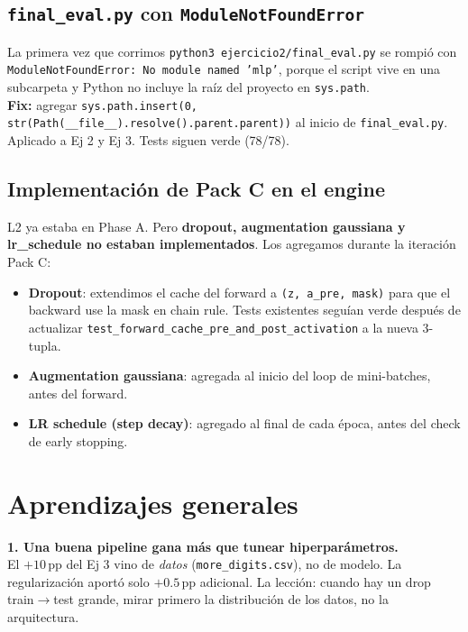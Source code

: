 \documentclass[11pt,a4paper]{article}
\newcommand{\code}[1]{\texttt{\textcolor{accent}{#1}}}
\newcommand{\file}[1]{\texttt{\small #1}}
\begin{document}
\subsection{\texttt{final\_eval.py} con \texttt{ModuleNotFoundError}}

La primera vez que corrimos \code{python3 ejercicio2/final\_eval.py} se rompió con \\
\code{ModuleNotFoundError: No module named 'mlp'}, porque el script vive en una subcarpeta y Python no incluye la raíz del proyecto en \code{sys.path}. \\[0.4em]
\textbf{Fix:} agregar \code{sys.path.insert(0, str(Path(\_\_file\_\_).resolve().parent.parent))} al inicio de \file{final\_eval.py}. Aplicado a Ej 2 y Ej 3. Tests siguen verde (78/78).

\subsection{Implementación de Pack C en el engine}

L2 ya estaba en Phase A. Pero \textbf{dropout, augmentation gaussiana y lr\_schedule no estaban implementados}. Los agregamos durante la iteración Pack C:
\begin{itemize}[leftmargin=1.4em, itemsep=2pt]
  \item \textbf{Dropout}: extendimos el cache del forward a \code{(z, a\_pre, mask)} para que el backward use la mask en chain rule. Tests existentes seguían verde después de actualizar \code{test\_forward\_cache\_pre\_and\_post\_activation} a la nueva 3-tupla.
  \item \textbf{Augmentation gaussiana}: agregada al inicio del loop de mini-batches, antes del forward.
  \item \textbf{LR schedule (step decay)}: agregado al final de cada época, antes del check de early stopping.
\end{itemize}

\section{Aprendizajes generales}

\begin{aprendimos}
\textbf{1. Una buena pipeline gana más que tunear hiperparámetros.}\\
El \(+10\)\,pp del Ej 3 vino de \emph{datos} (\code{more\_digits.csv}), no de modelo. La regularización aportó solo \(+0.5\)\,pp adicional. La lección: cuando hay un drop train$\to$test grande, mirar primero la distribución de los datos, no la arquitectura.
\end{aprendimos}
\end{document}
